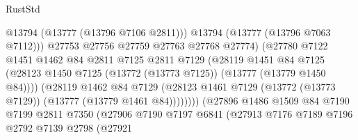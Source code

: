 \begin{lexlean}{RustStd}
\begin{coremodule}
                                          @13794
                                          (@13777 (@13796 @7106 @2811)))
                                        @13794
                                        (@13777 (@13796 @7063 @7112)))
                                      @27753
                                      @27756
                                      @27759
                                      @27763
                                      @27768
                                      @27774)
                                    (@27780
                                      @7122
                                      @1451
                                      @1462
                                      @84
                                      @2811
                                      @7125
                                      @2811
                                      @7129
                                      (@28119
                                        @1451
                                        @84
                                        @7125
                                        (@28123
                                          @1450
                                          @7125
                                          (@13772 (@13773 @7125))
                                          (@13777 (@13779 @1450 @84))))
                                      (@28119
                                        @1462
                                        @84
                                        @7129
                                        (@28123
                                          @1461
                                          @7129
                                          (@13772 (@13773 @7129))
                                          (@13777 (@13779 @1461 @84))))))))
                              (@27896
                                @1486
                                @1509
                                @84
                                @7190
                                @7199
                                @2811
                                @7350
                                (@27906
                                  @7190
                                  @7197
                                  @6841
                                  (@27913
                                    @7176
                                    @7189
                                    @7196
                                    @2792
                                    @7139
                                    @2798
                                    (@27921

\end{coremodule}
\end{lexlean}
